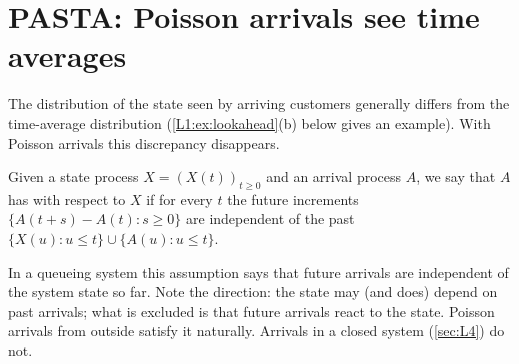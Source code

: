 
\section{PASTA: Poisson arrivals see time averages}

The distribution of the state seen by arriving customers generally differs from the
time-average distribution (\cref{L1:ex:lookahead}(b) below gives an example). With
Poisson arrivals this discrepancy disappears.

\begin{definition}\label{L1:def:lookahead}
Given a state process $X=(X(t))_{t\ge0}$ and an arrival process $A$, we say that $A$
has  with respect to $X$ if for every $t$ the future
increments $\{A(t+s)-A(t):s\ge0\}$ are independent of the past
$\{X(u):u\le t\}\cup\{A(u):u\le t\}$.
\end{definition}

In a queueing system this assumption says that future arrivals are independent of the
system state so far. Note the direction: the state may (and does) depend on past
arrivals; what is excluded is that future arrivals react to the state. Poisson arrivals
from outside satisfy it naturally. Arrivals in a closed system (\cref{sec:L4}) do not.

